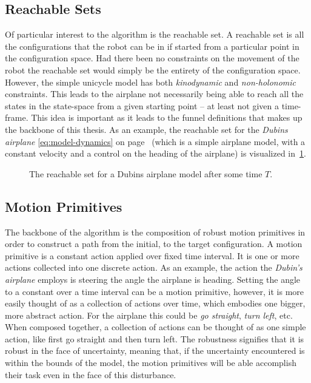 \subsection{Reachable Sets}
\label{subsec:reachable-set}

Of particular interest to the \rrtfunnel{} algorithm is the reachable set. A
reachable set is all the configurations that the robot can be in if started from
a particular point in the configuration space. Had there been no constraints on
the movement of the robot the reachable set would simply be the entirety of the
configuration space. However, the simple unicycle model has both
\textit{kinodynamic} and \textit{non-holonomic} constraints. This leads to the
airplane not necessarily being able to reach all the states in the state-space
from a given starting point -- at least not given a time-frame. This idea is
important as it leads to the funnel definitions that makes up the backbone of
this thesis. As an example, the reachable set for the \textit{Dubins airplane}
\eqref{eq:model-dynamics} on page~\pageref{eq:model-dynamics} (which is a simple
airplane model, with a constant velocity and a control on the heading of the
airplane) is visualized in~\cref{fig:reachable-set-dubin}.

\begin{figure}
  \centering 
  \caption[The reachable set for a Dubin's airplane model]{The reachable set for a Dubins airplane model after some time \(T\).}
  \label{fig:reachable-set-dubin}
\end{figure}

\subsection{Motion Primitives}

The backbone of the \rrtfunnel{} algorithm is the composition of robust motion
primitives in order to construct a path from the initial, to the target
configuration. A motion primitive is a constant action applied over fixed time
interval. It is one or more actions collected into one discrete action. As an
example, the action the \textit{Dubin's airplane} employs is steering the angle
the airplane is heading. Setting the angle to a constant over a time interval
can be a motion primitive, however, it is more easily thought of as a collection
of actions over time, which embodies one bigger, more abstract action. For the
airplane this could be \textit{go straight}, \textit{turn left}, etc. When
composed together, a collection of actions can be thought of as one simple
action, like first go straight and then turn left. The robustness signifies that
it is robust in the face of uncertainty, meaning that, if the uncertainty
encountered is within the bounds of the model, the motion primitives will be
able accomplish their task even in the face of this disturbance. 

